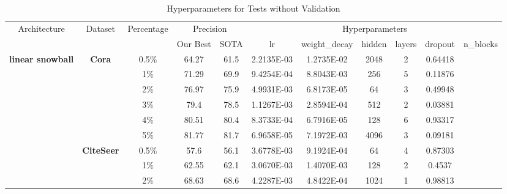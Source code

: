 \begin{table}[htbp]
\setlength{\tabcolsep}{1.5pt}
  \centering
  \caption{Hyperparameters for Tests without Validation}
  \scriptsize
    \begin{tabular}{ccccc|cccccc}
    \toprule
    \toprule
    \multirow{2}[1]{*}{Architecture} & \multirow{2}[1]{*}{Dataset} & \multirow{2}[1]{*}{Percentage} & \multicolumn{2}{c|}{Precision} & \multicolumn{6}{c}{Hyperparameters} \\
          &       &       & Our Best & SOTA  & lr    & weight\_decay & hidden & layers & dropout & n\_blocks \\
    \midrule
    \multirow{16}[2]{*}{\textbf{linear snowball}} & \multirow{6}[1]{*}{\textbf{Cora}} & 0.5\% & \cellcolor[rgb]{ .388,  .745,  .482}64.27 & \cellcolor[rgb]{ .973,  .412,  .42}61.5 & 2.2135E-03 & 1.2735E-02 & 2048  & 2     & 0.64418 & ~ \\
          &       & 1\%   & \cellcolor[rgb]{ .388,  .745,  .482}71.29 & \cellcolor[rgb]{ .973,  .412,  .42}69.9 & 9.4254E-04 & 8.8043E-03 & 256   & 5     & 0.11876 & ~ \\
          &       & 2\%   & \cellcolor[rgb]{ .388,  .745,  .482}76.97 & \cellcolor[rgb]{ .973,  .412,  .42}75.9 & 4.9931E-03 & 6.8173E-05 & 64    & 3     & 0.49948 & ~ \\
          &       & 3\%   & \cellcolor[rgb]{ .388,  .745,  .482}79.4 & \cellcolor[rgb]{ .973,  .412,  .42}78.5 & 1.1267E-03 & 2.8594E-04 & 512   & 2     & 0.03881 & ~ \\
          &       & 4\%   & \cellcolor[rgb]{ .388,  .745,  .482}80.51 & \cellcolor[rgb]{ .973,  .412,  .42}80.4 & 8.3733E-04 & 6.7916E-05 & 128   & 6     & 0.93317 & ~ \\
          &       & 5\%   & \cellcolor[rgb]{ .388,  .745,  .482}81.77 & \cellcolor[rgb]{ .973,  .412,  .42}81.7 & 6.9658E-05 & 7.1972E-03 & 4096  & 3     & 0.09181 & ~ \\
          & \multirow{6}[0]{*}{\textbf{CiteSeer}} & 0.5\% & \cellcolor[rgb]{ .388,  .745,  .482}57.6 & \cellcolor[rgb]{ .973,  .412,  .42}56.1 & 3.6778E-03 & 9.1924E-04 & 64    & 4     & 0.87303 & ~ \\
          &       & 1\%   & \cellcolor[rgb]{ .388,  .745,  .482}62.55 & \cellcolor[rgb]{ .973,  .412,  .42}62.1 & 3.0670E-03 & 1.4070E-03 & 128   & 2     & 0.4537 & ~ \\
          &       & 2\%   & \cellcolor[rgb]{ .388,  .745,  .482}68.63 & \cellcolor[rgb]{ .973,  .412,  .42}68.6 & 4.2287E-03 & 4.8422E-04 & 1024  & 1     & 0.98813 & ~ \\

\end{tabular}
\end{table}
